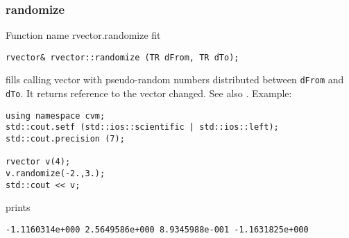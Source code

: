 \subsubsection{randomize}
Function%
\pdfdest name {rvector.randomize} fit
\begin{verbatim}
rvector& rvector::randomize (TR dFrom, TR dTo);
\end{verbatim}
fills calling vector with pseudo-random numbers distributed between
\verb"dFrom" and \verb"dTo".
It returns  reference to the vector changed.
See also
.
Example:
\begin{Verbatim}
using namespace cvm;
std::cout.setf (std::ios::scientific | std::ios::left); 
std::cout.precision (7);

rvector v(4);
v.randomize(-2.,3.);
std::cout << v;
\end{Verbatim}
prints
\begin{Verbatim}
-1.1160314e+000 2.5649586e+000 8.9345988e-001 -1.1631825e+000
\end{Verbatim}
\newpage

